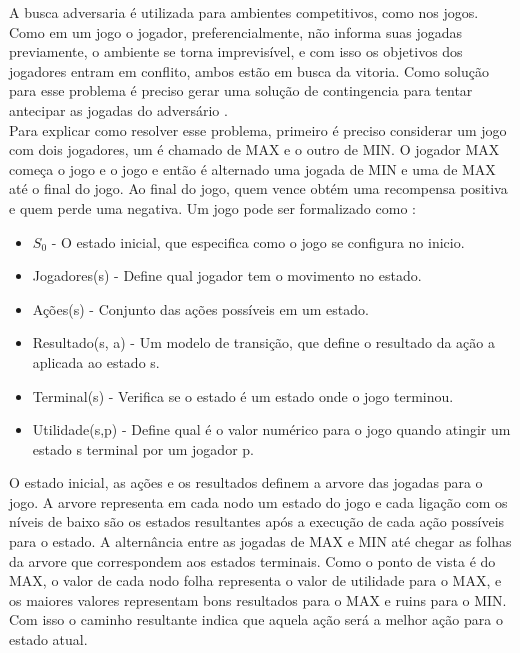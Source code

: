 A busca adversaria é utilizada para ambientes competitivos, como nos jogos. Como em um jogo o jogador, preferencialmente, não informa suas jogadas previamente, o ambiente se torna imprevisível, e com isso os objetivos dos jogadores entram em conflito, ambos estão em busca da vitoria. Como solução para esse problema é preciso gerar uma solução de contingencia para tentar antecipar as jogadas do adversário \cite{intelligence2003modern}. \\ 

Para explicar como resolver esse problema, primeiro é preciso considerar um jogo com dois jogadores, um é chamado de MAX e o outro de MIN. O jogador MAX começa o jogo e o jogo e então é alternado uma jogada de MIN e uma de MAX até o final do jogo. Ao final do jogo, quem vence obtém uma recompensa positiva e quem perde uma negativa. Um jogo pode ser formalizado como \cite{intelligence2003modern}:

\begin{itemize}
	\item $S_{0}$ - O estado inicial, que especifica como o jogo se configura no inicio.
	\item Jogadores(s) -  Define qual jogador tem o movimento no estado.
	\item Ações(s) - Conjunto das ações possíveis em um estado.
	\item Resultado(s, a) - Um modelo de transição, que define o resultado da ação a aplicada ao estado s.
	\item Terminal(s) - Verifica se o estado é um estado onde o jogo terminou.
	\item Utilidade(s,p) - Define qual é o valor numérico para o jogo quando atingir um estado s terminal por um jogador p. 
\end{itemize}
 
O estado inicial, as ações e os resultados definem a arvore das jogadas para o jogo. A arvore representa em cada nodo um estado do jogo e cada ligação com os níveis de baixo são os estados resultantes após a execução de cada ação possíveis para o estado. A alternância entre as jogadas de MAX e MIN até chegar as folhas da arvore que correspondem aos estados terminais. Como o ponto de vista é do MAX, o valor de cada nodo folha representa o valor de utilidade para o MAX, e os maiores valores representam bons resultados para o MAX e ruins para o MIN. Com isso o caminho resultante indica que aquela ação será a melhor ação para o estado atual. 


